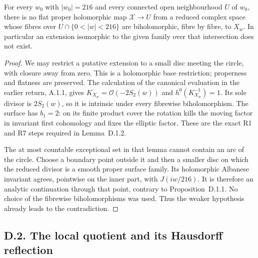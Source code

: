 \begin{theorem}\label{push:src:D.1.3}
For every \(w_0\) with \(|w_0|=216\) and every connected open
neighbourhood \(U\) of \(w_0\), there is no flat proper holomorphic
map \(\mathcal X\to U\) from a reduced complex space whose fibres
over \(U\cap\{0<|w|<216\}\) are biholomorphic, fibre by fibre, to
\(X_w\). In particular an extension isomorphic to the given family
over that intersection does not exist.
\end{theorem}
\begin{proof}
We may restrict a putative extension to a small disc meeting the
circle, with closure away from zero. This is a holomorphic base
restriction; properness and flatness are preserved. The calculation
of the canonical evaluation in the earlier return, A.1.1, gives
\(K_{X_w}=\mathcal O(-2S_2(w))\) and
\(h^0(K_{X_w}^{-1})=1\). Its sole divisor is \(2S_2(w)\), so it is
intrinsic under every fibrewise biholomorphism. The surface has
\(b_1=2\): on its finite product cover the rotation kills the moving
factor in invariant first cohomology and fixes the elliptic factor.
These are the exact R1 and R7 steps required in Lemma~D.1.2.

The at most countable exceptional set in that lemma cannot contain
an arc of the circle. Choose a boundary point outside it and then a smaller disc
on which the reduced divisor is a smooth proper surface family. Its
holomorphic Albanese invariant agrees, pointwise on the inner part,
with \(J(iw/216)\). It is therefore an analytic continuation through
that point, contrary to Proposition~D.1.1. No choice of the
fibrewise biholomorphisms was used. Thus the weaker hypothesis already
leads to the contradiction.
\end{proof}

\subsection{D.2. The local quotient and its Hausdorff reflection}

